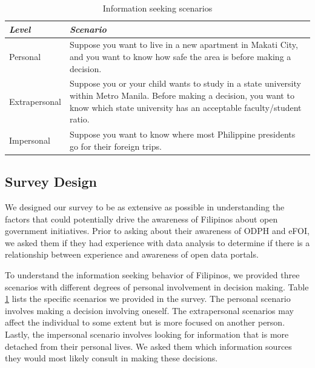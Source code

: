 \documentclass{sigchi}
\begin{document}
\begin{table}[t]
  \centering
  \begin{tabular}{l p{5.85cm}}
     \toprule
     \textbf{\textit{Level}} & \textbf{\textit{Scenario}} \\
     \midrule
     Personal & Suppose you want to live in a new apartment in Makati City, and you want to know how safe the area is before making a decision.\\
     \midrule
     Extrapersonal & Suppose you or your child wants to study in a state university within Metro Manila. Before making a decision, you want to know which state university has an acceptable faculty/student ratio.\\
     \midrule
     Impersonal & Suppose you want to know where most Philippine presidents go for their foreign trips.\\
     \bottomrule
  \end{tabular}
  \caption{Information seeking scenarios}
  \label{tab:scenarios}
\end{table}

\subsection{Survey Design}
We designed our survey to be as extensive as possible in understanding the factors that could potentially drive the awareness of Filipinos about open government initiatives. Prior to asking about their awareness of ODPH and eFOI, we asked them if they had experience with data analysis to determine if there is a relationship between experience and awareness of open data portals. 


To understand the information seeking behavior of Filipinos, we provided three scenarios with different degrees of personal involvement in decision making. Table \ref{tab:scenarios} lists the specific scenarios we provided in the survey. The personal scenario involves making a decision involving oneself. The extrapersonal scenarios may affect the individual to some extent but is more focused on another person. Lastly, the impersonal scenario involves looking for information that is more detached from their personal lives. We asked them which information sources they would most likely consult in making these decisions.
\end{document}

